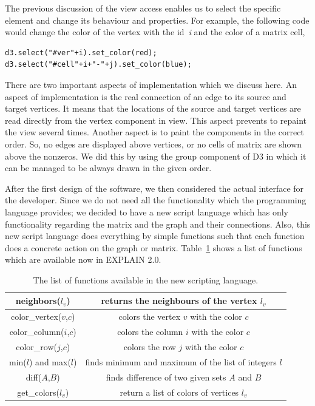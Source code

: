 \documentclass[11pt, twoside,a4paper]{book}
\begin{document}
The previous discussion of the view access enables us to select the
specific element and change its behaviour and properties. For example, the following
code would change the color of the vertex with the id~\textit{i} and the color
of a matrix cell,
\begin{lstlisting}
d3.select("#ver"+i).set_color(red);
d3.select("#cell"+i+"-"+j).set_color(blue);
\end{lstlisting}

There are two important aspects of implementation which we discuss here.
An aspect of implementation is the real connection of an edge to its
source and target vertices. It means that the locations of the source and target
vertices are read directly from the vertex component in view. This aspect prevents
to repaint the view several times.
Another aspect is to paint the components in the correct order. So, no edges
are displayed above vertices, or no cells of matrix are shown above the nonzeros.
We did this by using the group component of D3 in which it can be managed
to be always drawn in the given order.

After the first design of the software, we then considered the actual interface
for the developer. Since we do not need all the functionality which the
programming language provides; we decided to have a new script language which
has only functionality regarding the matrix and the graph and their
connections. Also, this new script language does everything by simple functions
such that each function does a concrete action on the graph or matrix.
Table~\ref{command-table} shows a list of functions which are available
now in EXPLAIN 2.0.
\begin{table}
\begin{tabular}{ | c | c |}
\hline
neighbors($l_v$) & returns the neighbours of the vertex $l_v$ \\ \hline
color\_vertex($v$,$c$) & colors the vertex $v$ with the color $c$ \\\hline
color\_column($i$,$c$) & colors the column $i$ with the color $c$ \\\hline
color\_row($j$,$c$) & colors the row $j$ with the color $c$ \\\hline
min($l$) and max($l$) & finds minimum and maximum of the list of integers $l$ \\\hline
diff($A$,$B$) & finds difference of two given sets $A$ and $B$ \\\hline
get\_colors($l_v$) & return a list of colors of vertices $l_v$ \\\hline
\end{tabular}
\caption{The list of functions available in the new scripting language.}
\label{command-table}
\end{table}
\end{document}
